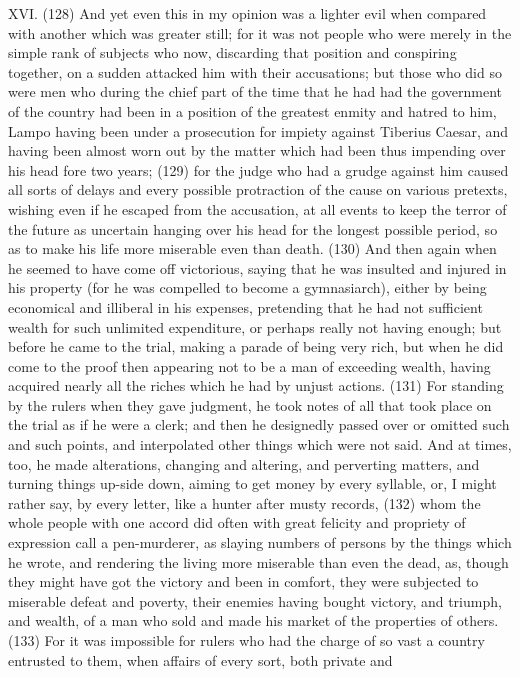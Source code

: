 XVI. (128) And yet even this in my opinion was a lighter evil when compared with another which
was greater still; for it was not people who were merely in the simple rank of subjects who now,
discarding that position and conspiring together, on a sudden attacked him with their accusations;
but those who did so were men who during the chief part of the time that he had had the
government of the country had been in a position of the greatest enmity and hatred to him, Lampo
having been under a prosecution for impiety against Tiberius Caesar, and having been almost
worn out by the matter which had been thus impending over his head fore two years; (129) for the
judge who had a grudge against him caused all sorts of delays and every possible protraction of
the cause on various pretexts, wishing even if he escaped from the accusation, at all events to
keep the terror of the future as uncertain hanging over his head for the longest possible period, so
as to make his life more miserable even than death. (130) And then again when he seemed to
have come off victorious, saying that he was insulted and injured in his property (for he was
compelled to become a gymnasiarch), either by being economical and illiberal in his expenses,
pretending that he had not sufficient wealth for such unlimited expenditure, or perhaps really not
having enough; but before he came to the trial, making a parade of being very rich, but when he did
come to the proof then appearing not to be a man of exceeding wealth, having acquired nearly all
the riches which he had by unjust actions. (131) For standing by the rulers when they gave
judgment, he took notes of all that took place on the trial as if he were a clerk; and then he
designedly passed over or omitted such and such points, and interpolated other things which were
not said. And at times, too, he made alterations, changing and altering, and perverting matters, and
turning things up-side down, aiming to get money by every syllable, or, I might rather say, by every
letter, like a hunter after musty records, (132) whom the whole people with one accord did often
with great felicity and propriety of expression call a pen-murderer, as slaying numbers of persons
by the things which he wrote, and rendering the living more miserable than even the dead, as,
though they might have got the victory and been in comfort, they were subjected to miserable
defeat and poverty, their enemies having bought victory, and triumph, and wealth, of a man who
sold and made his market of the properties of others. (133) For it was impossible for rulers who
had the charge of so vast a country entrusted to them, when affairs of every sort, both private and
